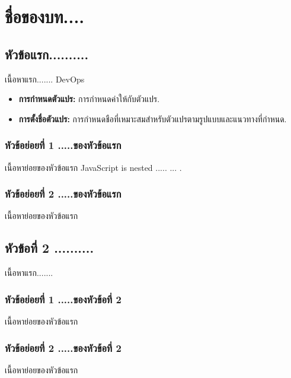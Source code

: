 \chapter{ชื่อของบท....}

\section{หัวข้อแรก..........}
เนื้อหาแรก....... \Gls{DevOps}

\begin{tcolorbox}[colframe=gray!60, colback=gray!6, title=แนวคิดสำคัญ:]
\begin{itemize}
\item{ {\bf การกำหนดตัวแปร:} การกำหนดค่าให้กับตัวแปร.}
\item{ {\bf การตั้งชื่อตัวแปร:} การกำหนดชือที่เหมาะสมสำหรับตัวแปรตามรูปแบบและแนวทางที่กำหนด.}
\end{itemize}
\end{tcolorbox}


\subsection{หัวข้อย่อยที่ 1 .....ของหัวข้อแรก}
เนื้อหาย่อยของหัวข้อแรก  JavaScript   is nested ..... ... .\textcite{flanagan2016javascript}

\subsection{หัวข้อย่อยที่ 2 .....ของหัวข้อแรก}
เนื้อหาย่อยของหัวข้อแรก


\section{หัวข้อที่ 2 ..........}
เนื้อหาแรก.......

\subsection{หัวข้อย่อยที่ 1 .....ของหัวข้อที่ 2}
เนื้อหาย่อยของหัวข้อแรก

\subsection{หัวข้อย่อยที่ 2 .....ของหัวข้อที่ 2}
เนื้อหาย่อยของหัวข้อแรก

